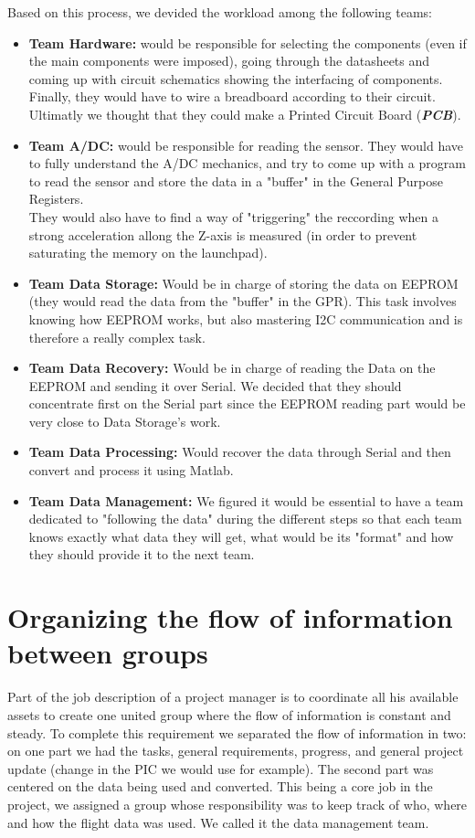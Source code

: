 \documentclass[12pt]{article}
\begin{document}
	Based on this process, we devided the workload among the following teams:
	\begin{itemize}
		\item \textbf{Team Hardware:} would be responsible for selecting the components (even if the main components were imposed), going through the datasheets and coming up with circuit schematics showing the interfacing of components. Finally, they would have to wire a breadboard according to their circuit. Ultimatly we thought that they could make a Printed Circuit Board (\textit{\textbf{PCB}}).
		\item \textbf{Team A/DC:} would be responsible for reading the sensor. They would have to fully understand the A/DC mechanics, and try to come up with a program to read the sensor and store the data in a "buffer" in the General Purpose Registers.\\
		They would also have to find a way of "triggering" the reccording when a strong acceleration allong the Z-axis is measured (in order to prevent saturating the memory on the launchpad).
		\item \textbf{Team Data Storage:} Would be in charge of storing the data on EEPROM (they would read the data from the "buffer" in the GPR). This task involves knowing how EEPROM works, but also mastering I2C communication and is therefore a really complex task.
		\item \textbf{Team Data Recovery:} Would be in charge of reading the Data on the EEPROM and sending it over Serial. We decided that they should concentrate first on the Serial part since the EEPROM reading part would be very close to Data Storage's work.
		\item \textbf{Team Data Processing:} Would recover the data through Serial and then convert and process it using Matlab.
		\item \textbf{Team Data Management:} We figured it would be essential to have a team dedicated to "following the data" during the different steps so that each team knows exactly what data they will get, what would be its "format" and how they should provide it to the next team.
	\end{itemize}

\newpage
\section{Organizing the flow of information between groups}
	Part of the job description of a project manager is to coordinate all his available assets to create one united group where the flow of information is constant and steady. To complete this requirement we separated the flow of information in two: on one part we had the tasks, general requirements, progress, and general project update (change in the PIC we would use for example). The second part was centered on the data being used and converted. This being a core job in the project, we assigned a group whose responsibility was to keep track of who, where and how the flight data was used. We called it the data management team.\\
\end{document}
